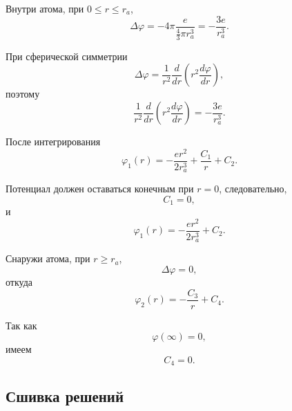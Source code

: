 \documentclass[../final.tex]{subfiles}
\begin{document}
Внутри атома, при $0\leq r\leq r_a$,
%
\begin{equation*}
    \Delta\varphi
    =
    -4\pi
    \frac{e}{\frac{4}{3}\pi r_a^3}
    =
    -\frac{3e}{r_a^3}.
\end{equation*}

При сферической симметрии
%
\begin{equation*}
    \Delta\varphi
    =
    \frac{1}{r^2}
    \frac{d}{dr}
    \left(
        r^2\frac{d\varphi}{dr}
    \right),
\end{equation*}
%
поэтому
%
\begin{equation*}
    \frac{1}{r^2}
    \frac{d}{dr}
    \left(
        r^2\frac{d\varphi}{dr}
    \right)
    =
    -\frac{3e}{r_a^3}.
\end{equation*}

После интегрирования
%
\begin{equation*}
    \varphi_1(r)
    =
    -\frac{er^2}{2r_a^3}
    +
    \frac{C_1}{r}
    +
    C_2.
\end{equation*}

Потенциал должен оставаться конечным при $r=0$, следовательно,
%
\begin{equation*}
    C_1=0,
\end{equation*}
%
и
%
\begin{equation*}
    \varphi_1(r)
    =
    -\frac{er^2}{2r_a^3}
    +
    C_2.
\end{equation*}

Снаружи атома, при $r\geq r_a$,
%
\begin{equation*}
    \Delta\varphi=0,
\end{equation*}
%
откуда
%
\begin{equation*}
    \varphi_2(r)
    =
    -\frac{C_3}{r}
    +
    C_4.
\end{equation*}

Так как
%
\begin{equation*}
    \varphi(\infty)=0,
\end{equation*}
%
имеем
%
\begin{equation*}
    C_4=0.
\end{equation*}



\subsection*{Сшивка решений}
\end{document}
